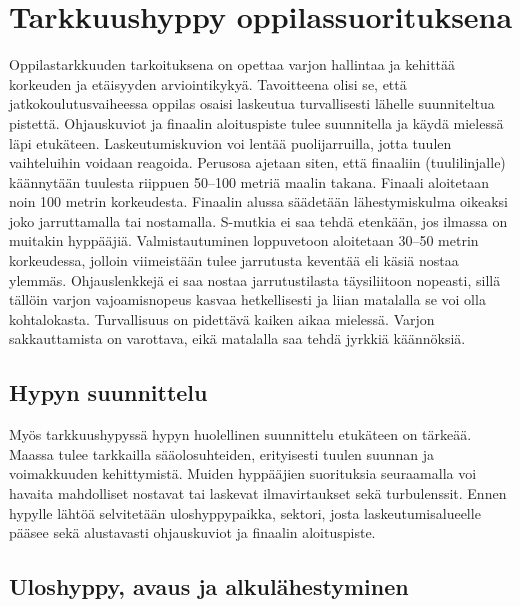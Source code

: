 \section{ Tarkkuushyppy oppilassuorituksena }
\label{kuvunkasittely-oppilaana-tarkkuushyppy-oppilassuorituksena}


Oppilastarkkuuden tarkoituksena on opettaa varjon hallintaa ja kehittää korkeuden ja etäisyyden arviointikykyä. Tavoitteena olisi se, että jatkokoulutusvaiheessa oppilas osaisi laskeutua turvallisesti lähelle suunniteltua pistettä. Ohjauskuviot ja finaalin aloituspiste tulee suunnitella ja käydä mielessä läpi etukäteen. Laskeutumiskuvion voi lentää puolijarruilla, jotta tuulen vaihteluihin voidaan reagoida. Perusosa ajetaan siten, että finaaliin (tuulilinjalle) käännytään tuulesta riippuen 50–100 metriä maalin takana. Finaali aloitetaan noin 100 metrin korkeudesta. Finaalin alussa säädetään lähestymiskulma oikeaksi joko jarruttamalla tai nostamalla. S-mutkia ei saa tehdä etenkään, jos ilmassa on muitakin hyppääjiä. Valmistautuminen loppuvetoon aloitetaan 30–50 metrin korkeudessa, jolloin viimeistään tulee jarrutusta keventää eli käsiä nostaa ylemmäs. Ohjauslenkkejä ei saa nostaa jarrutustilasta täysiliitoon nopeasti, sillä tällöin varjon vajoamisnopeus kasvaa hetkellisesti ja liian matalalla se voi olla kohtalokasta. Turvallisuus on pidettävä kaiken aikaa mielessä. Varjon sakkauttamista on varottava, eikä matalalla saa tehdä jyrkkiä käännöksiä. 

\subsection{ Hypyn suunnittelu }
\label{kuvunkasittely-oppilaana-hypyn-suunnittelu}


Myös tarkkuushypyssä hypyn huolellinen suunnittelu etukäteen on tärkeää. Maassa tulee tarkkailla sääolosuhteiden, erityisesti tuulen suunnan ja voimakkuuden kehittymistä. Muiden hyppääjien suorituksia seuraamalla voi havaita mahdolliset nostavat tai laskevat ilmavirtaukset sekä turbulenssit. Ennen hypylle lähtöä selvitetään uloshyppypaikka, sektori, josta laskeutumisalueelle pääsee sekä alustavasti ohjauskuviot ja finaalin aloituspiste. 

\subsection{ Uloshyppy, avaus ja alkulähestyminen }
\label{kuvunkasittely-oppilaana-uloshyppy-avaus-ja-alkulahestyminen}



